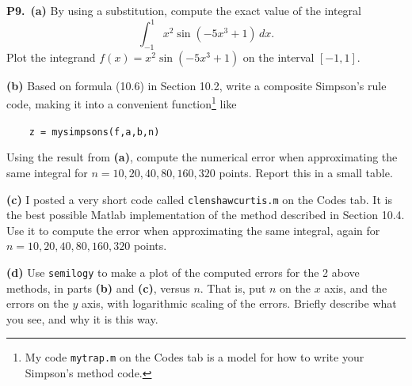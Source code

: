 \documentclass[12pt]{amsart}
\newcommand{\prob}[1]{\bigskip\noindent\textbf{#1.}\quad }
\newcommand{\epart}[1]{\medskip\noindent\textbf{(#1)}\quad }
\newcommand{\ppart}[1]{\,\textbf{(#1)}\quad }
\begin{document}
\prob{P9}  \ppart{a} By using a substitution, compute the exact value of the integral
          $$\int_{-1}^1 x^2 \sin(-5x^3+1)\,dx.$$
Plot the integrand $f(x) = x^2 \sin(-5x^3+1)$ on the interval $[-1,1]$.

\epart{b}  Based on formula (10.6) in Section 10.2, write a composite Simpson's rule code, making it into a convenient function\footnote{My code \texttt{mytrap.m} on the Codes tab is a model for how to write your Simpson's method code.} like
      
       \verb|    z = mysimpsons(f,a,b,n)|

\noindent Using the result from \textbf{(a)}, compute the numerical error when approximating the same integral for $n=10,20,40,80,160,320$ points.  Report this in a small table.

\epart{c}  I posted a very short code called \texttt{clenshawcurtis.m} on the Codes tab.  It is the best possible Matlab implementation of the method described in Section 10.4.  Use it to compute the error when approximating the same integral, again for $n=10,20,40,80,160,320$ points.

\epart{d}  Use \texttt{semilogy} to make a plot of the computed errors for the 2 above methods, in parts \textbf{(b)} and \textbf{(c)}, versus $n$.  That is, put $n$ on the $x$ axis, and the errors on the $y$ axis, with logarithmic scaling of the errors.  Briefly describe what you see, and why it is this way.

\end{document}
